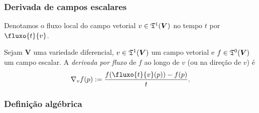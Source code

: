 \subsubsection{Derivada de campos escalares}

Denotamos o fluxo local do campo vetorial $v \in \mathfrak{T}^1(\bm V)$ no tempo $t$ por $\fluxo{t}{v}$.

\begin{definition}
Sejam $\bm V$ uma variedade diferencial, $v \in \mathfrak{T}^1(\bm V)$ um campo vetorial e $f \in \mathfrak{T}^0(\bm V)$ um campo escalar. A \emph{derivada por fluxo} de $f$ ao longo de $v$ (ou na direção de $v$) é
	\begin{equation*}
	\Dir_v f(p) := \frac{f(\fluxo{t}{v}(p))-f(p)}{t}.
	\end{equation*}
\end{definition}





\subsubsection{Definição algébrica}

